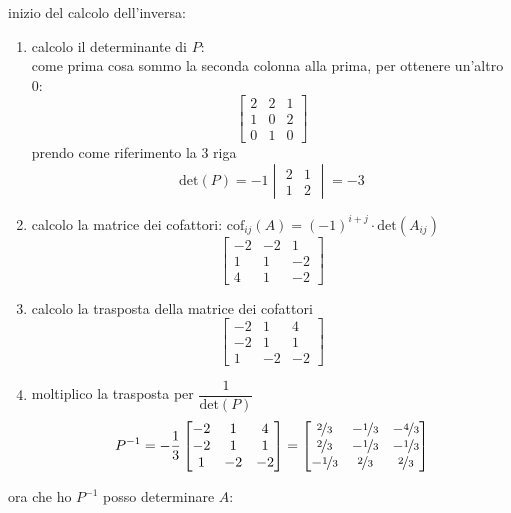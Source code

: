 \documentclass[italian]{article}
\renewcommand{\det}[1]{\text{det$\left(#1\right)$}}
\newcommand{\cof}[2]{\text{cof$_{#1}\left(#2\right)$}}
\begin{document}
inizio del calcolo dell'inversa:
\begin{enumerate}
	\item calcolo il determinante di $P$:\\[2mm]
	come prima cosa sommo la seconda colonna alla prima, per ottenere un'altro 0:
		\[
			\begin{bmatrix}
				2 & 2 & 1 \\
				1 & 0 & 2 \\
				0 & 1 & 0
			\end{bmatrix}
		\]
		prendo come riferimento la 3 riga
		\[
			\det{P} =
			-1
			\begin{vmatrix}
				2 & 1 \\
				1 & 2
			\end{vmatrix}
			=
			-3
		\]
		
	\item calcolo la matrice dei cofattori: $\cof{ij}{A} = (-1)^{i+j}\cdot \det{A_{ij}}$
		\[
			\begin{bmatrix}
				-2 & -2 & 1 \\
				1 & 1 & -2 \\
				4 & 1 & -2
			\end{bmatrix}
		\]
	\item calcolo la trasposta della matrice dei cofattori
		\[
			\begin{bmatrix}
				-2 & 1 & 4 \\
				-2 & 1 & 1 \\
				1 & -2 & -2
			\end{bmatrix}
		\]
	\item moltiplico la trasposta per $\dfrac{1}{\det{P}}$
		\[
			P^{-1} =
			-\dfrac{1}{3}
			\begin{bmatrix}
				-2 & 1 & 4 \\
				-2 & 1 & 1 \\
				1 & -2 & -2
			\end{bmatrix}
			=
			\begin{bmatrix}
				\nicefrac{2}{3} & -\nicefrac{1}{3} & -\nicefrac{4}{3} \\
				\nicefrac{2}{3} & -\nicefrac{1}{3} & -\nicefrac{1}{3} \\
				-\nicefrac{1}{3} & \nicefrac{2}{3} & \nicefrac{2}{3}
			\end{bmatrix}
		\]
\end{enumerate}
ora che ho $P^{-1}$ posso determinare $A$:
\end{document}
